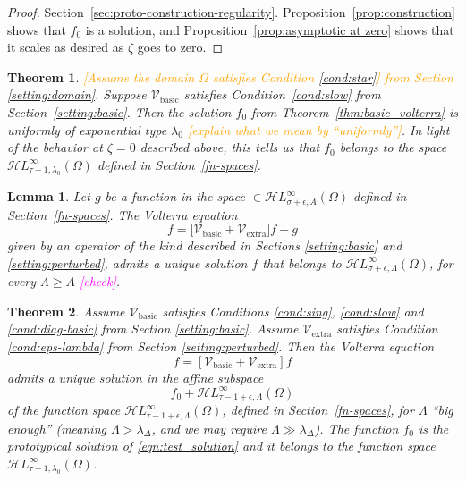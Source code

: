 \documentclass{article}
\theoremstyle{plain}
\newtheorem{lemma}{Lemma}
\newtheorem{thm}{Theorem}
\newcommand{\singexp}[2]{\mathcal{H}L^\infty_{#1, #2}}
\newcommand{\hardpart}{\mathcal{V}_\text{basic}}
\newcommand{\softpart}{\mathcal{V}_\text{extra}}
\newcommand{\domain}{\Omega}
\begin{document}
\begin{proof}
Section~\ref{sec:proto-construction-regularity}. Proposition~\ref{prop:construction} shows that $f_0$ is a solution, and Proposition~\ref{prop:asymptotic at zero} shows that it scales as desired as $\zeta$ goes to zero.
\end{proof}
\begin{thm}\label{thm:proto-growth}
\textcolor{orange}{[Assume the domain $\domain$ satisfies {\em Condition \eqref{cond:star}}] from Section \ref{setting:domain}}. Suppose $\hardpart$ satisfies {\em Condition~\eqref{cond:slow}} from Section~\ref{setting:basic}. Then the solution $f_0$ from {\em Theorem~\ref{thm:basic_volterra}} is uniformly of exponential type $\lambda_0$ \textcolor{orange}{[explain what we mean by ``uniformly'']}. In light of the behavior at $\zeta = 0$ described above, this tells us that $f_0$ belongs to the space $\singexp{\tau-1}{\lambda_0}(\domain)$ defined in Section~\ref{fn-spaces}.
\end{thm}
\begin{lemma}\label{thm:perturbed_volterra}
Let $g$ be a function in the space $\in\singexp{\sigma+\epsilon}{A}(\Omega)$ defined in Section~\ref{fn-spaces}. The Volterra equation
\[ f = \Big[\hardpart +\softpart \Big] f + g \]
given by an operator of the kind described in Sections \ref{setting:basic} and \ref{setting:perturbed}, admits a unique solution $f$ that belongs to $\singexp{\sigma+\epsilon}{\Lambda}(\Omega)$, for every $\Lambda\geq A$ \textcolor{magenta}{[check]}. 
\end{lemma}

\begin{thm}\label{thm:general_volterra}
    Assume $\hardpart$ satisfies {\em Conditions \eqref{cond:sing}, \eqref{cond:slow}} and {\em \eqref{cond:diag-basic}} from Section \ref{setting:basic}. Assume $\softpart$ satisfies {\em Condition \eqref{cond:eps-lambda}} from Section \ref{setting:perturbed}. Then the Volterra equation 
    \[f = \left[ \hardpart + \softpart \right] f\]
    admits a unique solution in the affine subspace
\[ f_0 + \singexp{\tau-1+\epsilon}{{\Lambda}}(\Omega) \]
of the function space $\singexp{\tau-1+\epsilon}{{\Lambda}}(\Omega)$, defined in Section~\ref{fn-spaces}, for $\Lambda$ ``big enough'' (meaning $\Lambda>\lambda_\Delta$, and we may require $\Lambda \gg \lambda_\Delta$). The function $f_0$ is the prototypical solution of \eqref{eqn:test_solution} and it belongs to the function space $\singexp{\tau-1}{\lambda_0}(\Omega)$.
\end{thm}
\end{document}
